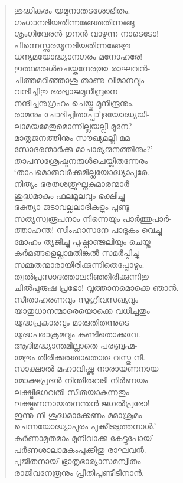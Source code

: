 \begin{verse}
ശുദ്ധികരം യമുനാതടശോഭിതം.\\
ഗംഗാനദിയതിന്നങ്ങേതതിന്നങ്ങു\\
ശൃംഗിവേരന്‍ ഗുനന്‍ വാഴുന്ന നാടെടോ!\\
പിന്നെസ്സരയൂനദിയതിന്നങ്ങേതു\\
ധന്യമയോദ്ധ്യാനഗരം മനോഹരേ!\\
ഇത്ഥമരുള്‍ചെയ്തനേരത്തു രാഘവന്‍-\\
ചിത്തമറിഞ്ഞാശു താണു വിമാനവും\\
വന്ദിച്ചിതു ഭരദ്വാജമുനീന്ദ്രനെ\\
നന്ദിച്ചനുഗ്രഹം ചെയ്തു മുനീന്ദ്രനും.\\
രാമനും ചോദിച്ചിതപ്പോ’ളയോദ്ധ്യയി-\\
ലാമയമേതുമൊന്നില്ലയല്ലീ മുനേ?\\
മാതൃജനത്തിനും സൗഖ്യമല്ലീ മമ\\
സോദരന്മാര്‍ക്കു മാചാര്യജനത്തിനും?’\\
താപസശ്രേഷ്ഠനരുള്‍ചെയ്തിതന്നേരം\\
‘താപമൊരുവര്‍ക്കുമില്ലയോദ്ധ്യാപുരേ.\\
നിത്യം ഭരതശത്രുഘ്നകുമാരന്മാര്‍\\
ശുദ്ധമാകും ഫലമൂലവും ഭക്ഷിച്ചു\\
ഭക്ത്യാ ജടാവല്ക്കലാദികളും പൂണ്ടു\\
സത്യസ്വരൂപനാം നിന്നെയും പാര്‍ത്തുപാര്‍-\\
ത്താഹന്ത! സിംഹാസനേ പാദുകം വെച്ചു\\
മോഹം ത്യജിച്ചു പുഷ്പാഞ്ജലിയും ചെയ്തു\\
കര്‍മങ്ങളെല്ലാമതിങ്കല്‍ സമര്‍പ്പിച്ചു\\
സമ്മതന്മാരായിരിക്കുന്നിതെപ്പോഴും.\\
ത്വല്‍പ്രസാദത്താലറിഞ്ഞിരിക്കുന്നിതു\\
ചില്‍പുരുഷ പ്രഭോ! വൃത്താനമൊക്കെ ഞാന്‍.\\
സീതാഹരണവും സുഗ്രീവസഖ്യവും\\
യാതുധാനന്മാരെയൊക്കെ വധിച്ചതും\\
യുദ്ധപ്രകാരവും മാരുതിതന്നുടെ\\
യുദ്ധപരാക്രമവും കണ്ടിതൊക്കവേ.\\
ആദിമദ്ധ്യാന്തമില്ലാതെ പരബ്രഹ്മ-\\
മേതും തിരിക്കരുതാതൊരു വസ്തു നീ.\\
സാക്ഷാല്‍ മഹാവിഷ്ണു നാരായണനായ\\
മോക്ഷപ്രദന്‍ നിന്തിരുവടി നിര്‍ണയം\\
ലക്ഷ്മീഭഗവതി സീതയാകുന്നതും\\
ലക്ഷ്മണനായതനന്തന്‍ ജഗല്‍പ്രഭോ!\\
ഇന്നു നീ ശുദ്ധമാക്കേണം മമാശ്രമം\\
ചെന്നയോദ്ധ്യാപുരം പുക്കീടടുത്തനാള്‍.’\\
കര്‍ണാമൃതമാം മുനിവാക്കു കേട്ടുപോയ്\\
പര്‍ണശാലാമകംപുക്കിതു രാഘവന്‍.\\
പൂജിതനായ് ഭ്രാതൃഭാര്യാസമന്വിതം\\
രാജീവനേത്രനും പ്രീതിപൂണ്ടീടിനാന്‍.
\end{verse}

